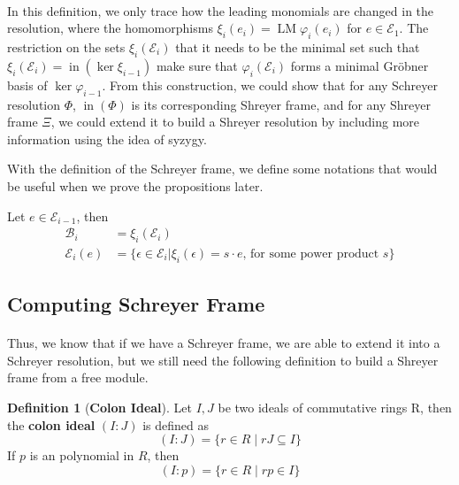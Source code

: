 \documentclass{article}
\newcommand{\im}{\ensuremath{\operatorname{im}}}
\newcommand{\lm}{\ensuremath{\operatorname{LM}}}
\newcommand{\coker}{\ensuremath{\operatorname{coker}}}
\newcommand{\initTerm}{\ensuremath{\operatorname{in}}}
\renewcommand{\to}{\ensuremath{\rightarrow}}
\theoremstyle{definition}
\newtheorem{definition}{Definition}[section]
\theoremstyle{remark}
\theoremstyle{example}
\begin{document}

\paragraph{}

In this definition, we only trace how the leading monomials are changed in the resolution, where the homomorphisms $\xi_i(e_i) = \lm \varphi_i(e_i)$ for $e \in \mathcal{E}_1$. The restriction on the sets $\xi_i(\mathcal{E}_i)$ that it needs to be the minimal set such that $\xi_i(\mathcal{E}_i) = \initTerm(\ker \xi_{i-1})$ make sure that $\varphi_i(\mathcal{E}_i)$ forms a minimal Gröbner basis of $\ker \varphi_{i-1}$. From this construction, we could show that for any Schreyer resolution $\Phi$, $\initTerm (\Phi)$ is its corresponding Shreyer frame, and for any Shreyer frame $\Xi$, we could extend it to build a Shreyer resolution by including more information using the idea of syzygy.

With the definition of the Schreyer frame, we define some notations that would be useful when we prove the propositions later.

Let $e \in \mathcal{E}_{i-1}$, then
\begin{align}
    \mathcal{B}_i &= \xi_{i}(\mathcal{E}_i)\\
    \mathcal{E}_i(e) &= \{\epsilon \in \mathcal{E}_i \lvert \xi_{i}(\epsilon) = s \cdot e \text{, for some power product }s\}
\end{align}


\subsection{Computing Schreyer Frame}

\paragraph{}

Thus, we know that if we have a Schreyer frame, we are able to extend it into a Schreyer resolution, but we still need the following definition to build a Shreyer frame from a free module.

\begin{definition}[\textbf{Colon Ideal}]
    Let $I, J$ be two ideals of commutative rings R, then the \textbf{colon ideal} $(I:J)$ is defined as
    \begin{equation}
        (I:J) = \{r \in R \; \lvert \;rJ \subseteq I\}
    \end{equation}
    If $p$ is an polynomial in $R$, then 
    \begin{equation}
        (I:p) = \{r \in R \; \lvert \; rp \in I\}
    \end{equation}
\end{definition}
\end{document}
